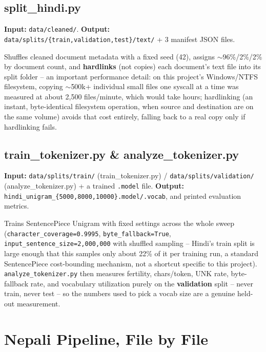 \documentclass[11pt]{report}
\begin{document}
\section{split\_hindi.py}

\textbf{Input:} \texttt{data/cleaned/}. \textbf{Output:}
\texttt{data/splits/\{train,validation,test\}/text/} + 3 manifest JSON
files.

Shuffles cleaned document metadata with a fixed seed (42), assigns
$\sim$96\%/2\%/2\% by document count, and \textbf{hardlinks} (not
copies) each document's text file into its split folder -- an important
performance detail: on this project's Windows/NTFS filesystem, copying
$\sim$500k+ individual small files one syscall at a time was measured at
about 2,500 files/minute, which would take hours; hardlinking (an
instant, byte-identical filesystem operation, when source and destination
are on the same volume) avoids that cost entirely, falling back to a real
copy only if hardlinking fails.

\section{train\_tokenizer.py \& analyze\_tokenizer.py}

\textbf{Input:} \texttt{data/splits/train/} (train\_tokenizer.py) /
\texttt{data/splits/validation/} (analyze\_tokenizer.py) + a trained
\texttt{.model} file. \textbf{Output:}
\texttt{hindi\_unigram\_\{5000,8000,10000\}.model/.vocab}, and printed
evaluation metrics.

Trains SentencePiece Unigram with fixed settings across the whole sweep
(\texttt{character\_coverage=0.9995}, \texttt{byte\_fallback=True},
\texttt{input\_sentence\_size=2{,}000{,}000} with shuffled sampling --
Hindi's train split is large enough that this samples only about 22\% of
it per training run, a standard SentencePiece cost-bounding mechanism,
not a shortcut specific to this project). \texttt{analyze\_tokenizer.py}
then measures fertility, chars/token, UNK rate, byte-fallback rate, and
vocabulary utilization purely on the \textbf{validation} split -- never
train, never test -- so the numbers used to pick a vocab size are a
genuine held-out measurement.

\chapter{Nepali Pipeline, File by File}
\end{document}
